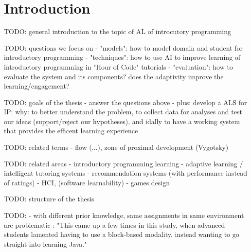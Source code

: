 \chapter{Introduction}
\label{chap:introduction}

TODO: general introduction to the topic of AL of introcutory programming

TODO: questions we focus on
- "models": how to model domain and student for introductory programming
- "techniques": how to use AI to improve learning of introductory programming
  in "Hour of Code" tutorials
- "evaluation": how to evaluate the system and its components?
  does the adaptivity improve the learning/engagement?

TODO: goals of the thesis
- answer the questions above
- plus: develop a ALS for IP: why: to better understand the problem,
  to collect data for analyses and test our ideas (support/reject our hypotheses),
  and idally to have a working system that provides the efficent learning experience

TODO: related terms
- flow (...), zone of proximal development (Vygotsky)


TODO: related areas
- introductory programming learning
- adaptive learning / intelligent tutoring systems
- recommendation systems (with performance instead of ratings)
- HCI, (software learnability)
- games design \cite{book-of-lenses}


TODO: structure of the thesis


TODO:
- with different prior knowledge, same assignments in same environment are problematic
\cite{comparing-blocks-text-weintrop2017}:
"This came up a few times in this study, when advanced students lamented
having to use a block-based modality, instead wanting to go straight into learning Java."
